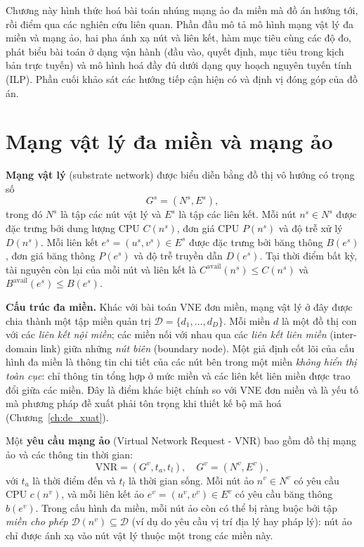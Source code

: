 \documentclass[../DoAn.tex]{subfiles}
\begin{document}
\label{ch:bai_toan}

Chương này hình thức hoá bài toán nhúng mạng ảo đa miền mà đồ án hướng tới, rồi điểm qua các nghiên cứu liên quan. Phần đầu mô tả mô hình mạng vật lý đa miền và mạng ảo, hai pha ánh xạ nút và liên kết, hàm mục tiêu cùng các độ đo, phát biểu bài toán ở dạng vận hành (đầu vào, quyết định, mục tiêu trong kịch bản trực tuyến) và mô hình hoá đầy đủ dưới dạng quy hoạch nguyên tuyến tính (ILP). Phần cuối khảo sát các hướng tiếp cận hiện có và định vị đóng góp của đồ án.

\section{Mạng vật lý đa miền và mạng ảo}
\label{sec:vne_model}

\textbf{Mạng vật lý} (substrate network) được biểu diễn bằng đồ thị vô hướng có trọng số
\[
    G^s = (N^s, E^s),
\]
trong đó $N^s$ là tập các nút vật lý và $E^s$ là tập các liên kết. Mỗi nút $n^s \in N^s$ được đặc trưng bởi dung lượng CPU $C(n^s)$, đơn giá CPU $P(n^s)$ và độ trễ xử lý $D(n^s)$. Mỗi liên kết $e^s = (u^s, v^s) \in E^s$ được đặc trưng bởi băng thông $B(e^s)$, đơn giá băng thông $P(e^s)$ và độ trễ truyền dẫn $D(e^s)$. Tại thời điểm bất kỳ, tài nguyên còn lại của mỗi nút và liên kết là $C^{\text{avail}}(n^s) \leq C(n^s)$ và $B^{\text{avail}}(e^s) \leq B(e^s)$.

\textbf{Cấu trúc đa miền.} Khác với bài toán VNE đơn miền, mạng vật lý ở đây được chia thành một tập miền quản trị $\mathcal{D}=\{d_1,\ldots,d_D\}$. Mỗi miền $d$ là một đồ thị con với các \textit{liên kết nội miền}; các miền nối với nhau qua các \textit{liên kết liên miền} (inter-domain link) giữa những \textit{nút biên} (boundary node). Một giả định cốt lõi của cấu hình đa miền là thông tin chi tiết của các nút bên trong một miền \textit{không hiển thị toàn cục}: chỉ thông tin tổng hợp ở mức miền và các liên kết liên miền được trao đổi giữa các miền. Đây là điểm khác biệt chính so với VNE đơn miền và là yếu tố mà phương pháp đề xuất phải tôn trọng khi thiết kế bộ mã hoá (Chương~\ref{ch:de_xuat}).

Một \textbf{yêu cầu mạng ảo} (Virtual Network Request - VNR) bao gồm đồ thị mạng ảo và các thông tin thời gian:
\[
    \text{VNR} = (G^v, t_a, t_l), \quad G^v = (N^v, E^v),
\]
với $t_a$ là thời điểm đến và $t_l$ là thời gian sống. Mỗi nút ảo $n^v \in N^v$ có yêu cầu CPU $c(n^v)$, và mỗi liên kết ảo $e^v = (u^v, v^v) \in E^v$ có yêu cầu băng thông $b(e^v)$. Trong cấu hình đa miền, mỗi nút ảo còn có thể bị ràng buộc bởi tập \textit{miền cho phép} $\mathcal{D}(n^v) \subseteq \mathcal{D}$ (ví dụ do yêu cầu vị trí địa lý hay pháp lý): nút ảo chỉ được ánh xạ vào nút vật lý thuộc một trong các miền này.
\end{document}
